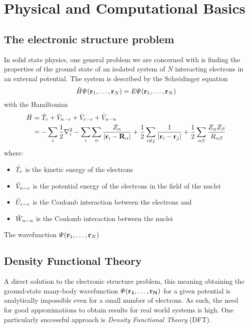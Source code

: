 \documentclass[main.tex]{subfiles}
\begin{document}
\chapter{Physical and Computational Basics\label{chap:theory}}

\section{The electronic structure problem\label{sec:theory_schrödinger}}

In solid state physics, one general problem we are concerned with is finding the properties of the ground state of an isolated system of \(N\) interacting electrons in an external potential.
The system is described by the Schrödinger equation
\begin{equation}
    \hat{H} \Psi (\vb{r}_1, \ldots, \vb{r}_N) = E \Psi (\vb{r}_1, \ldots, \vb{r}_N)
\end{equation}
with the Hamiltonian
\begin{align}
    \hat{H} &= \hat{T}_e + \hat{V}_{n-e} + \hat{V}_{e-e} + \hat{V}_{n-n} \\
    &= -\sum_i \frac{1}{2} \nabla^2_i - \sum_i \sum_{\alpha} \frac{Z_{\alpha}}{\vert \vb{r}_i - \vb{R}_{\alpha} \vert} + \frac{1}{2} \sum_{i \neq j} \frac{1}{\vert \vb{r}_i - \vb{r}_j \vert} + \frac{1}{2} \sum_{\alpha \beta} \frac{Z_{\alpha} Z_{\beta}}{R_{\alpha \beta}}
\end{align}
where:
\begin{itemize}
    \item \(\hat{T}_e\) is the kinetic energy of the electrons
    \item \(\hat{V}_{n-e}\) is the potential energy of the electrons in the field of the nuclei
    \item \(\hat{U}_{e-e}\) is the Coulomb interaction between the electrons and
    \item \(\hat{W}_{n-n}\) is the Coulomb interaction between the nuclei
\end{itemize}

The wavefunction \(\Psi (\vb{r}_1, \ldots, \vb{r}_N)\) 


\section{Density Functional Theory\label{sec:theory_dft}}

A direct solution to the electronic structure problem, this meaning obtaining the ground-state many-body wavefunction \(\Psi (\vb{r_1}, \ldots, \vb{r_N})\) for a given potential is analytically impossible even for a small number of electrons. 
As such, the need for good approximations to obtain results for real world
systems is high.
One particularly successful approach is \emph{Density Functional Theory} (DFT).
\end{document}
